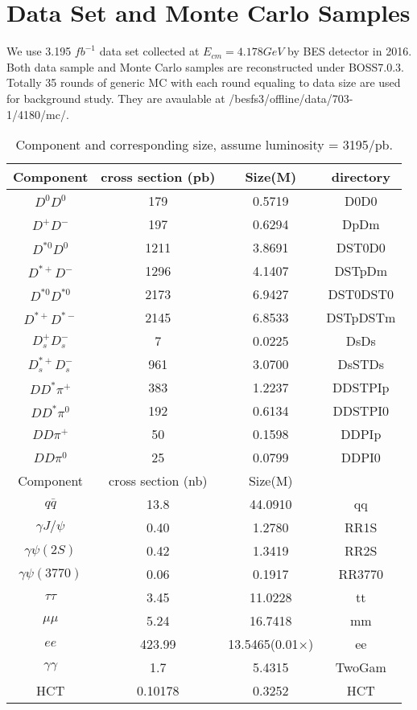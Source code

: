 \section{Data Set and Monte Carlo Samples}
We use 3.195 $fb^{-1}$ data set collected at $E_{cm} = 4.178 GeV$ by BES\uppercase\expandafter{} detector in 2016. Both data sample and Monte Carlo samples are reconstructed under BOSS7.0.3. Totally 35 rounds of generic MC with each round equaling to data size are used for background study. They are avaulable at
/besfs3/offline/data/703-1/4180/mc/.
\begin{table}[htp]
\begin{center}
\caption{Component and corresponding size, assume luminosity = 3195/pb.}
\begin{tabular}{c|c|c|c} \hline
Component        & cross section (pb) & Size(M) & directory \\ \hline
$D^{0}D^{0}$     &        179         & 0.5719  &  D0D0 \\
$D^{+}D^{-}$     &        197         & 0.6294  &  DpDm \\
$D^{*0}D^{0}$    &       1211         & 3.8691  &  DST0D0 \\
$D^{*+}D^{-}$    &       1296         & 4.1407  &  DSTpDm \\
$D^{*0}D^{*0}$   &       2173         & 6.9427  &  DST0DST0 \\
$D^{*+}D^{*-}$   &       2145         & 6.8533  &  DSTpDSTm \\
$D_{s}^{+}D_{s}^{-}$ &      7         & 0.0225  &  DsDs \\
$D_{s}^{*+}D_{s}^{-}$ &   961         & 3.0700  &  DsSTDs \\
\hline
$DD^{*}\pi^{+}$  &        383         & 1.2237  &  DDSTPIp \\
$DD^{*}\pi^{0}$  &        192         & 0.6134  &  DDSTPI0 \\
$DD\pi^{+}$      &         50         & 0.1598  &  DDPIp \\
$DD\pi^{0}$      &         25         & 0.0799  &  DDPI0 \\
\hline
Component        &  cross section (nb)& Size(M)\\ \hline
$q\bar{q}$       &       13.8         & 44.0910  & qq \\
$\gamma J/\psi$  &        0.40        &  1.2780  & RR1S \\
$\gamma \psi(2S)$&        0.42        &  1.3419  & RR2S \\
$\gamma \psi(3770)$ &     0.06        &  0.1917  & RR3770 \\
$\tau \tau$      &        3.45        & 11.0228  & tt \\
$\mu \mu$        &        5.24        & 16.7418  & mm \\
$ee$             &      423.99        & 13.5465(0.01$\times$)  & ee\\
$\gamma \gamma$  &        1.7         &  5.4315   & TwoGam \\
HCT              &        0.10178     &  0.3252   & HCT \\
\hline
\end{tabular}
\label{tab:genMC}
\end{center}


\end{table}
